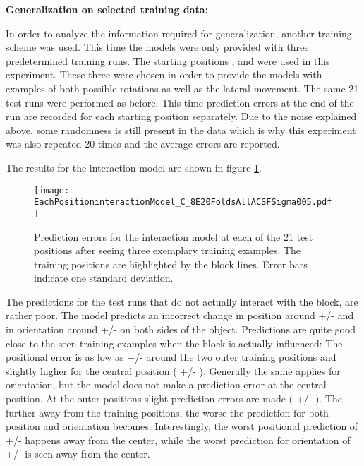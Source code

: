 \textbf{Generalization on selected training data:}

In order to analyze the information required for generalization, another training scheme was used. This time the models were only provided with three predetermined training runs. The starting positions ,  and  were used in this experiment. These three were chosen in order to provide the models with examples of both possible rotations as well as the lateral movement. The same 21 test runs were performed as before. This time prediction errors at the end of the run are recorded for each starting position separately. Due to the noise explained above, some randomness is still present in the data which is why this experiment was also repeated 20 times and the average errors are reported. 

The results for the interaction model are shown in figure \ref{fig:eachPosInteraction}.

\begin{figure}
\centering
\texttt{[image: EachPositioninteractionModel\_C\_8E20FoldsAllACSFSigma005.pdf]}
\caption{Prediction errors for the interaction model at each of the 21 test positions after seeing three exemplary training examples. The training positions are highlighted by the block lines. Error bars indicate one standard deviation.}
\label{fig:eachPosInteraction}
\end{figure}

The predictions for the test runs that do not actually interact with the block, are rather poor. The model predicts an incorrect change in position around  +/-  and in orientation around  +/-  on both sides of the object. 
Predictions are quite good close to the seen training examples when the block is actually influenced: The positional error is as low as  +/-  around the two outer training positions and slightly higher for the central position ( +/- ). Generally the same applies for orientation, but the model does not make a prediction error at the central position. At the outer positions slight prediction errors are made ( +/- ).
The further away from the training positions, the worse the prediction for both position and orientation becomes. Interestingly, the worst positional prediction of  +/-   happens  away from the center, while the worst prediction for orientation of  +/-  is seen  away from the center.

